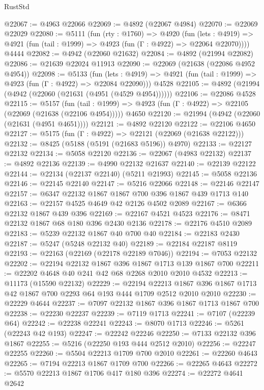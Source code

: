 \begin{lexlean}{RustStd}
\begin{coremodule}
@22067 := @4963 @22066
@22069 := @4892 (@22067 @4984)
@22070 := @22069 @22029
@22080 := @5111
    (fun (rty : @1760) =>
    @4920
      (fun (lets : @4919) =>
      @4921 (fun (tail : @1999) => @4923 (fun (Γ : @4922) => @22064 @22070))))
    @4444
@22082 := @4942 (@22060 @21632)
@22084 := @4892 (@21994 @22082)
@22086 := @21639 @22024 @11913
@22090 := @22069 (@21638 (@22086 @4952 @4954))
@22098 := @5133
    (fun (lets : @4919) => @4921 (fun (tail : @1999) => @4923 (fun (Γ : @4922) => @22084 @22090)))
    @4528
@22105 := @4892 (@21994 (@4942 (@22060 (@21631 (@4951 (@4529 @4954))))))
@22106 := @22086 @4528
@22115 := @5157
    (fun (tail : @1999) => @4923 (fun (Γ : @4922) => @22105 (@22069 (@21638 (@22106 @4954)))))
    @4650
@22120 := @21994 (@4942 (@22060 (@21631 (@4951 @4651))))
@22121 := @4892 @22120
@22122 := @22106 @4650
@22127 := @5175 (fun (Γ : @4922) => @22121 (@22069 (@21638 @22122)))
@22132 := @8425 (@5188 (@5191 (@21683 @5196)) @4970)
@22133 := @22127 @22132
@22134 := @5058 @22120
@22136 := @22067 (@4983 @22132)
@22137 := @4892 @22136
@22139 := @4990 @22132 @21637
@22140 := @22139 @22122
@22144 := @22134 (@22137 @22140) (@5211 @21993)
@22145 := @5058 @22136
@22146 := @22145 @22140
@22147 := @5216 @22066
@22148 := @22146 @22147
@22157 := @6347 @22132 @1867 @1867 @700 @396 @1867 @439 @1713 @140
@22163 := @22157 @4525 @4649 @42 @2126 @4502 @2089
@22167 := @6366 @22132 @1867 @439 @396
@22169 := @22167 @4521 @4523
@22176 := @8471 @22132 @1867 @68 @180 @396 @2430 @2136
@22178 := @22176 @4510 @2089
@22183 := @5239 @22132 @1867 @40 @700 @40
@22184 := @22183 @2430
@22187 := @5247 (@5248 @22132 @40)
@22189 := @22184 @22187 @8119
@22193 := @22163 (@22169 (@22178 @22189 @7046))
@22194 := @7053 @22132
@22202 := @22194 @22132 @1867 @396 @1867 @1713 @139 @1867 @700
@22211 := @22202 @4648 @40 @241 @42 @68 @2268 @2010 @2010 @4532
@22213 := @11173 (@15590 @22132)
@22229 := @22194
    @22213
    @1867
    @396
    @1867
    @1713
    @42
    @1867
    @700
    @2293
    @64
    @193
    @444
    @1709
    @2512
    @2010
    @2010
@22230 := @22229 @4644
@22237 := @7097 @22132 @1867 @396 @1867 @1713 @1867 @700
@22238 := @22230 @22237
@22239 := @7119 @1713
@22241 := @7107 (@22239 @64)
@22242 := @22238 @22241
@22243 := @8070 @1713
@22246 := @5261 (@22243 @42 @193)
@22247 := @22242 @22246
@22250 := @7133 @22132 @396 @1867
@22255 := @5216 (@22250 @193 @444 @2512 @2010)
@22256 := @22247 @22255
@22260 := @5504 @22213 @1709 @700 @2010
@22261 := @22260 @4643
@22265 := @7194 @22213 @1867 @1709 @700
@22266 := @22265 @4643
@22272 := @5570 @22213 @1867 @1706 @417 @180 @396
@22274 := @22272 @4641 @2642

\end{coremodule}
\end{lexlean}
